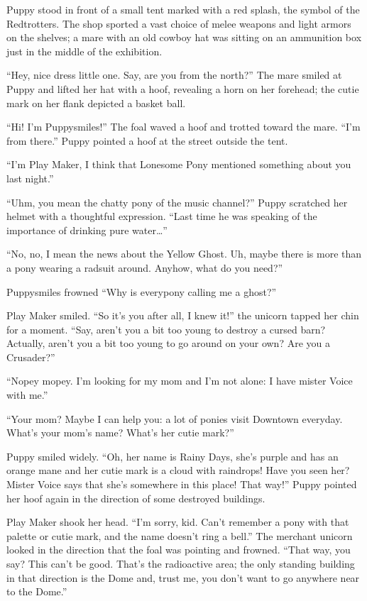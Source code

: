 Puppy stood in front of a small tent marked with a red splash, the symbol of the Redtrotters. The shop sported a vast choice of melee weapons and light armors on the shelves; a mare with an old cowboy hat was sitting on an ammunition box just in the middle of the exhibition.

``Hey, nice dress little one. Say, are you from the north?'' The mare smiled at Puppy and lifted her hat with a hoof, revealing a horn on her forehead; the cutie mark on her flank depicted a basket ball.

``Hi! I'm Puppysmiles!'' The foal waved a hoof and trotted toward the mare. ``I'm from there.'' Puppy pointed a hoof at the street outside the tent.

``I'm Play Maker, I think that Lonesome Pony mentioned something about you last night.''

``Uhm, you mean the chatty pony of the music channel?'' Puppy scratched her helmet with a thoughtful expression. ``Last time he was speaking of the importance of drinking pure water\dots''

``No, no, I mean the news about the Yellow Ghost. Uh, maybe there is more than a pony wearing a radsuit around. Anyhow, what do you need?''

Puppysmiles frowned ``Why is everypony calling me a ghost?''

Play Maker smiled. ``So it's you after all, I knew it!'' the unicorn tapped her chin for a moment. ``Say, aren't you a bit too young to destroy a cursed barn? Actually, aren't you a bit too young to go around on your own? Are you a Crusader?''

``Nopey mopey. I'm looking for my mom and I'm not alone: I have mister Voice with me.''

``Your mom? Maybe I can help you: a lot of ponies visit Downtown everyday. What's your mom's name? What's her cutie mark?''

Puppy smiled widely. ``Oh, her name is Rainy Days, she's purple and has an orange mane and her cutie mark is a cloud with raindrops! Have you seen her? Mister Voice says that she's somewhere in this place! That way!'' Puppy pointed her hoof again in the direction of some destroyed buildings.

Play Maker shook her head. ``I'm sorry, kid. Can't remember a pony with that palette or cutie mark, and the name doesn't ring a bell.'' The merchant unicorn looked in the direction that the foal was pointing and frowned. ``That way, you say? This can't be good. That's the radioactive area; the only standing building in that direction is the Dome and, trust me, you don't want to go anywhere near to the Dome.''

